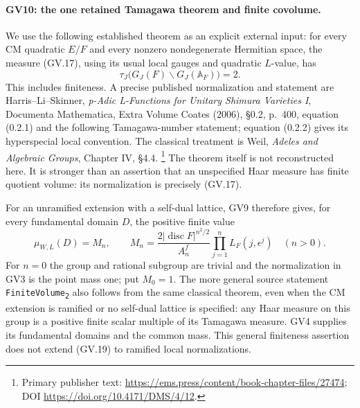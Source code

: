 \paragraph{GV10: the one retained Tamagawa theorem and finite covolume.}
We use the following established theorem as an explicit external input:
for every CM quadratic $E/F$ and every nonzero nondegenerate Hermitian
space, the measure (GV.17), using its usual local gauges and quadratic
$L$-value, has
\[
                    \tau_J\bigl(G_J(F)\backslash G_J(\mathbb A_F)\bigr)=2.
 \tag{GV.20}
\]
This includes finiteness. A precise published normalization and statement
are Harris--Li--Skinner, \emph{p-Adic L-Functions for Unitary Shimura
Varieties I}, Documenta Mathematica, Extra Volume Coates (2006),
\S0.2, p.~400, equation (0.2.1) and the following Tamagawa-number
statement; equation (0.2.2) gives its hyperspecial local convention.
The classical treatment is Weil, \emph{Adeles and Algebraic Groups},
Chapter IV, \S4.4.
\footnote{Primary publisher text:
\url{https://ems.press/content/book-chapter-files/27474};
DOI \url{https://doi.org/10.4171/DMS/4/12}.}
The theorem itself is not reconstructed here. It is stronger than
an assertion that an unspecified Haar measure has finite quotient
volume: its normalization is precisely (GV.17).

For an unramified extension with a self-dual lattice, GV9 therefore
gives, for every fundamental domain $D$, the positive finite value
\[
 \mu_{W,L}(D)=M_n,\qquad
 M_n=\frac{2|\operatorname{disc}F|^{n^2/2}}
                   {A_n^f}\prod_{j=1}^nL_F(j,\epsilon^j)
                   \quad(n>0).                     \tag{GV.21}
\]
For $n=0$ the group and rational subgroup are trivial and the
normalization in GV3 is the point mass one; put $M_0=1$.
The more general source statement \texttt{FiniteVolume\textsubscript{2}}
also follows from the same classical theorem, even when the CM
extension is ramified or no self-dual lattice is specified: any Haar
measure on this group is a positive finite scalar multiple of its
Tamagawa measure. GV4 supplies its fundamental domains and the common
mass. This general finiteness assertion does not extend (GV.19) to
ramified local normalizations.

